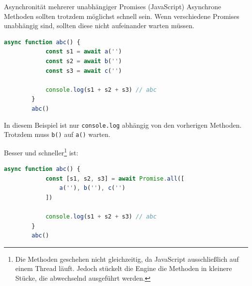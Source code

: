 \begin{bonus}{Asynchronität mehrerer unabhängiger Promises (JavaScript)}
    Asynchrone Methoden sollten trotzdem möglichst schnell sein.
    Wenn verschiedene Promises unabhängig sind, sollten diese nicht aufeinander warten müssen.

    \begin{lstlisting}[language=JavaScript]
        async function abc() {
            const s1 = await a('')
            const s2 = await b('')
            const s3 = await c('')

            console.log(s1 + s2 + s3) // abc
        }
        abc()
    \end{lstlisting}
    In diesem Beispiel ist nur \texttt{console.log} abhängig von den vorherigen Methoden.
    Trotzdem muss \texttt{b()} auf \texttt{a()} warten.

    Besser und schneller\footnote{
        Die Methoden geschehen nicht gleichzeitig, da JavaScript ausschließlich auf einem Thread läuft.
        Jedoch stückelt die Engine die Methoden in kleinere Stücke, die abwechselnd ausgeführt werden.
    } ist:
    \begin{lstlisting}[language=JavaScript]
        async function abc() {
            const [s1, s2, s3] = await Promise.all([
                a(''), b(''), c('')
            ])

            console.log(s1 + s2 + s3) // abc
        }
        abc()
    \end{lstlisting}
\end{bonus}

